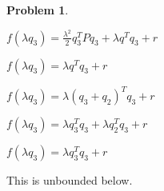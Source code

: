 \documentclass{article}
\theoremstyle{definition}
\newtheorem{problem}{Problem}
\begin{document}
\begin{problem}
\begin{enumerate}
    $f(\lambda q_3) = \frac{\lambda^2}{2} q_3^TPq_3 + \lambda q^Tq_3 + r$ \newline

    $f(\lambda q_3) = \lambda q^Tq_3 + r$ \newline

    $f(\lambda q_3) = \lambda (q_3 + q_2)^Tq_3 + r$ \newline

    $f(\lambda q_3) = \lambda q_3^Tq_3 + \lambda q_2^Tq_3 + r$ \newline

    $f(\lambda q_3) = \lambda q_3^Tq_3  + r$ \newline

    This is unbounded below. 
    
\end{enumerate}

\end{problem}
\end{document}
